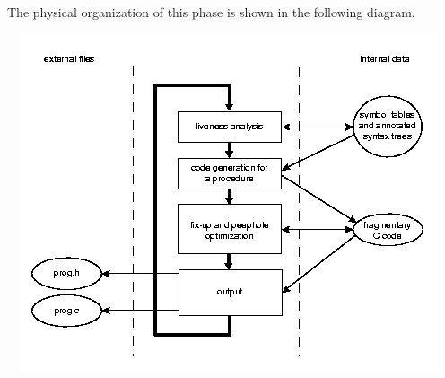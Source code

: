 The physical organization of this phase is shown in the following diagram.

\includegraphics[width=5.1311in,height=3.9063in]{kw/figure6-2.png} 


\bigskip


\bigskip

